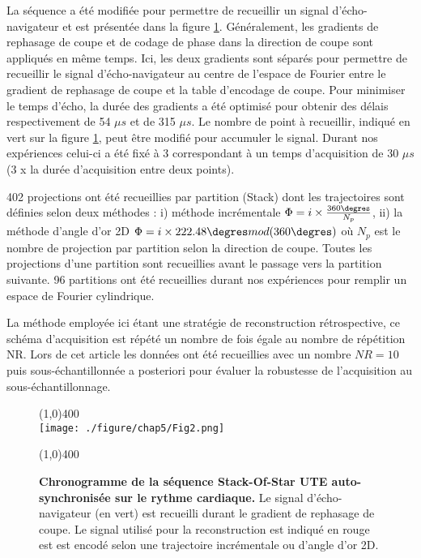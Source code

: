 La séquence a été modifiée pour permettre de recueillir un signal d'écho-navigateur et est présentée dans la figure \ref{fig:SeqSoSUTE}. Généralement, les gradients de rephasage de coupe et de codage de phase dans la direction de coupe sont appliqués en même temps. Ici, les deux gradients sont séparés pour permettre de recueillir le signal d'écho-navigateur au centre de l'espace de Fourier entre le gradient de rephasage de coupe et la table d'encodage de coupe. 
Pour minimiser le temps d'écho, la durée des gradients a été optimisé pour obtenir des délais respectivement de 54 $\mu s$ et de 315 $\mu s$.  Le nombre de point à recueillir, indiqué en vert sur la figure \ref{fig:SeqSoSUTE}, peut être modifié pour accumuler le signal. Durant nos expériences celui-ci a été fixé à 3 correspondant à un temps d'acquisition de 30 $\mu s$ (3 x la durée d'acquisition entre deux points).

402 projections ont été recueillies par partition (Stack) dont les trajectoires sont définies selon deux méthodes : i) méthode incrémentale $\Phi = i \times \frac{360\degres}{N_p}$, ii) la méthode d'angle d'or 2D $\Phi = i \times 222.48\degres mod(360\degres)$ où $N_p$ est le nombre de projection par partition selon la direction de coupe. Toutes les projections d'une partition sont recueillies avant le passage vers la partition suivante. 96 partitions ont été recueillies durant nos expériences pour remplir un espace de Fourier cylindrique.

La méthode employée ici étant une stratégie de reconstruction rétrospective, ce schéma d'acquisition est répété un nombre de fois égale au nombre de répétition NR. Lors de cet article les données ont été recueillies avec un nombre ${NR}=10$ puis sous-échantillonnée a posteriori pour évaluer la robustesse de l'acquisition au sous-échantillonnage.

\begin{figure}[H]
\centering
\line(1,0){400} \\
\texttt{[image: ./figure/chap5/Fig2.png]}
\caption[Chronogramme de la séquence Stack-Of-Star UTE auto-synchronisée sur le rythme cardiaque.]{\label{fig:SeqSoSUTE}\textbf{Chronogramme de la séquence Stack-Of-Star UTE auto-synchronisée sur le rythme cardiaque.} Le signal d'écho-navigateur (en vert) est recueilli durant le gradient de rephasage de coupe. Le signal utilisé pour la reconstruction est indiqué en rouge est est encodé selon une trajectoire incrémentale ou d'angle d'or 2D.}
\line(1,0){400} \\ 
\end{figure}

